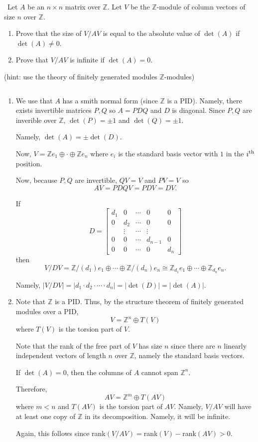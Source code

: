 \documentclass[12pt]{AlgebraQual}
\begin{document}
\begin{problem} $\,$
Let $A$ be an $n\times n$ matrix over $\mathbb{Z}$. Let $V$ be the $\mathbb{Z}$-module of column vectors of size $n$ over $\mathbb{Z}$.
\begin{enumerate}[label=(\alph*)]
    \item Prove that the size of $V/AV$ is equal to the absolute value of $\det(A)$ if $\det(A)\not=0$.
    \item Prove that $V/AV$ is infinite if $\det(A)=0$.
\end{enumerate}
(hint: use the theory of finitely generated modules $\mathbb{Z}$-modules)
\end{problem}


\begin{solution}$\,$
\begin{enumerate}[label=(\alph*)]
    \item We use that $A$ has a smith normal form (since $\mathbb{Z}$ is a PID). Namely, there exists invertible matrices $P,Q$ so $A=PDQ$ and $D$ is diagonal. Since $P,Q$ are inverible over $\mathbb{Z}$, $\det(P)=\pm1$ and $\det(Q)=\pm1$.

    Namely, $\det(A)=\pm \det(D)$.

    Now, $V=\mathbb{Z}e_1\oplus\cdot\oplus\mathbb{Z}e_n$ where $e_i$ is the standard basis vector with $1$ in the $i^\text{th}$ position.

    Now, because $P,Q$ are invertible, $QV=V$ and $PV=V$ so $$AV=PDQV=PDV=DV.$$

    If $$D=\begin{bmatrix}
    d_1 & 0 & \cdots & 0 & 0\\
    0 & d_2 & \cdots & 0 & 0\\
    & \vdots & \cdots & \vdots &\\
    0 & 0 &\cdots & d_{n-1} & 0\\
    0 & 0 & \cdots & 0 & d_n
    \end{bmatrix}$$ then $$V/DV=\mathbb{Z}/(d_1)e_1\oplus\cdots\oplus \mathbb{Z}/(d_n)e_n\cong\mathbb{Z}_{d_1}e_1\oplus\cdots\oplus\mathbb{Z}_{d_n}e_n.$$

    Namely, $|V/DV|=|d_1\cdot d_2\cdot\cdots\cdot d_n|=|\det(D)|=|\det(A)|.$

    \item  Note that $\mathbb{Z}$ is a PID. Thus, by the structure theorem of finitely generated modules over a PID, $$V=\mathbb{Z}^n\oplus T(V)$$ where $T(V)$ is the torsion part of $V.$

    Note that the rank of the free part of $V$ has size $n$ since there are $n$ linearly independent vectors of length $n$ over $\mathbb{Z}$, namely the standard basis vectors.

    If $\det(A)=0$, then the columns of $A$ cannot span $\mathbb{Z}^n$.

    Therefore, $$AV=\mathbb{Z}^m\oplus T(AV)$$ where $m<n$ and $T(AV)$ is the torsion part of $AV.$ Namely, $V/AV$ will have at least one copy of $\mathbb{Z}$ in its decomposition. Namely, it will be infinite.

    Again, this follows since rank$(V/AV)=$rank$(V)-$rank$(AV)>0$.
\end{enumerate}
\end{solution}
\end{document}
